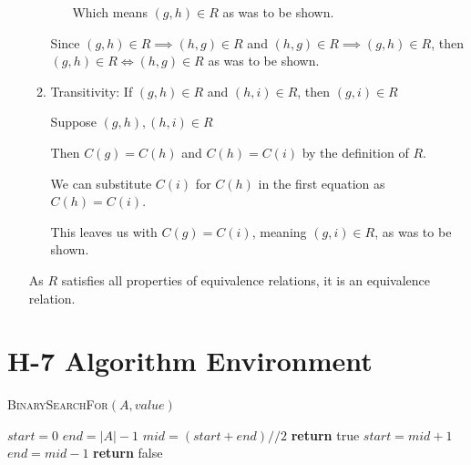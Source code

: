 \documentclass{article}
\begin{document}
\begin{enumerate}
\begin{enumerate}
\begin{enumerate}
       Which means $(g, h) \in R$ as was to be shown.
        \end{enumerate}
        Since $(g, h) \in R \implies (h, g) \in R$ and $(h, g) \in R \implies (g, h) \in R$, then $(g, h) \in R \iff (h, g) \in R$ as was to be shown.
        
        \item Transitivity: If $(g, h) \in R$ and $(h, i) \in R$, then $(g, i) \in R$
        
        Suppose $(g, h), (h, i) \in R$
        
        Then $C(g) = C(h)$ and $C(h) = C(i)$ by the definition of $R$.
        
        We can substitute $C(i)$ for $C(h)$ in the first equation as $C(h) = C(i)$.
        
        This leaves us with $C(g) = C(i)$, meaning $(g, i) \in R$, as was to be shown.
        \end{enumerate}
        As $R$ satisfies all properties of equivalence relations, it is an equivalence relation.
\end{enumerate}
\section{H-7 Algorithm Environment}
\label{appendix:h7-2}
\begin{algorithm}
            \caption{\textsc{BinarySearchFor}$(A, value)$}\label{alg:forloop}
            \begin{algorithmic}
            \State $start = 0$
            \State$ end = |A|-1$
                	\State $mid = (start + end) // 2$
            			\State \textbf{return} true
					\State $start = mid + 1$
				\Else{}
					\State $end = mid-1$
      			\EndIf
                \EndFor
                \State \textbf{return} false
            \end{algorithmic}
        \end{algorithm}
\end{document}
